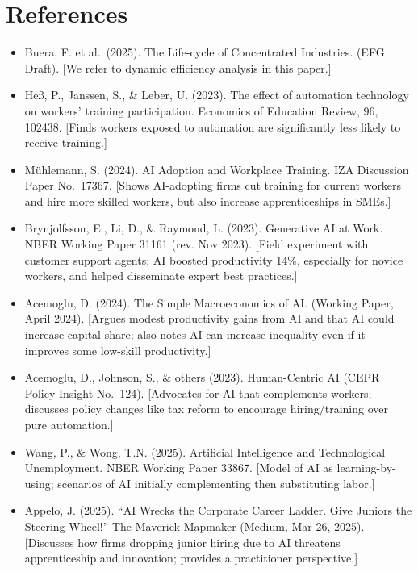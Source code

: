 \documentclass[12pt]{article}
\begin{document}
\section*{References}\label{references}
\begin{itemize}

\item
  Buera, F. et al.~(2025). {The Life-cycle of Concentrated
  Industries}. (EFG Draft). {[}We refer to dynamic efficiency analysis
  in this paper.{]}
\item
  Heß, P., Janssen, S., \& Leber, U. (2023). {The effect of
  automation technology on workers' training participation}.
  {Economics of Education Review, 96}, 102438. {[}Finds workers
  exposed to automation are significantly less likely to receive
  training.{]}
\item
  Mühlemann, S. (2024). {AI Adoption and Workplace Training}. IZA
  Discussion Paper No.~17367. {[}Shows AI-adopting firms cut training
  for current workers and hire more skilled workers, but also increase
  apprenticeships in SMEs.{]}
\item
  Brynjolfsson, E., Li, D., \& Raymond, L. (2023). {Generative AI
  at Work}. NBER Working Paper 31161 (rev. Nov 2023). {[}Field
  experiment with customer support agents; AI boosted productivity 14\%,
  especially for novice workers, and helped disseminate expert best
  practices.{]}
\item
  Acemoglu, D. (2024). {The Simple Macroeconomics of AI}. (Working
  Paper, April 2024). {[}Argues modest productivity gains from AI and
  that AI could increase capital share; also notes AI can increase
  inequality even if it improves some low-skill productivity.{]}
\item
  Acemoglu, D., Johnson, S., \& others (2023). {Human-Centric AI}
  (CEPR Policy Insight No.~124). {[}Advocates for AI that complements
  workers; discusses policy changes like tax reform to encourage
  hiring/training over pure automation.{]}
\item
  Wang, P., \& Wong, T.N. (2025). {Artificial Intelligence and
  Technological Unemployment}. NBER Working Paper 33867. {[}Model of AI
  as learning-by-using; scenarios of AI initially complementing then
  substituting labor.{]}
\item
  Appelo, J. (2025). ``AI Wrecks the Corporate Career Ladder. Give
  Juniors the Steering Wheel!'' {The Maverick Mapmaker} (Medium,
  Mar 26, 2025). {[}Discusses how firms dropping junior hiring due to AI
  threatens apprenticeship and innovation; provides a practitioner
  perspective.{]}
\end{itemize}
\end{document}
